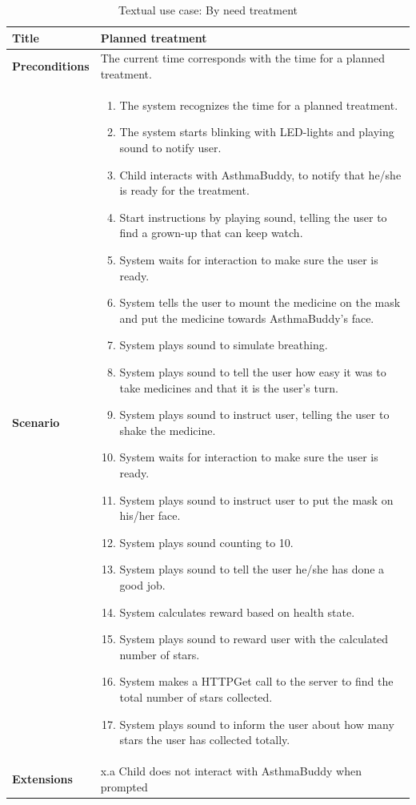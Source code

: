 \begin{table}[H]
\centering
\begin{tabular}{|p{4.0cm} | p{9.0cm} |}
\hline
\textbf{Title} & Planned treatment \\
\hline
\textbf{Preconditions} & The current time corresponds with the time for a planned treatment. \\
\hline 
\textbf{Scenario} & 
	\begin{enumerate}
	  \itemsep0em
	  \item The system recognizes the time for a planned treatment.
	  \item The system starts blinking with LED-lights and playing sound to notify user.
	  \item Child interacts with AsthmaBuddy, to notify that he/she is ready for the treatment.
	  \item Start instructions by playing sound, telling the user to find a grown-up that can keep watch.
	  \item System waits for interaction to make sure the user is ready.
	  \item System tells the user to mount the medicine on the mask and put the medicine towards AsthmaBuddy's face.
	  \item System plays sound to simulate breathing.
	  \item System plays sound to tell the user how easy it was to take medicines and that it is the user's turn.
	  \item System plays sound to instruct user, telling the user to shake the medicine.
	  \item System waits for interaction to make sure the user is ready.
	  \item System plays sound to instruct user to put the mask on his/her face.
	  \item System plays sound counting to 10. 
	  \item System plays sound to tell the user he/she has done a good job.
	  \item System calculates reward based on health state.
	  \item System plays sound to reward user with the calculated number of stars.
	  \item System makes a HTTPGet call to the server to find the total number of stars collected.
	  \item System plays sound to inform the user about how many stars the user has collected totally.
	\end{enumerate}
\\
\hline
	\textbf{Extensions} & 
		x.a Child does not interact with AsthmaBuddy when prompted
\\
\hline
\end{tabular}
\caption{Textual use case: By need treatment}
\label{tab:textual-use-case}
\end{table} 


